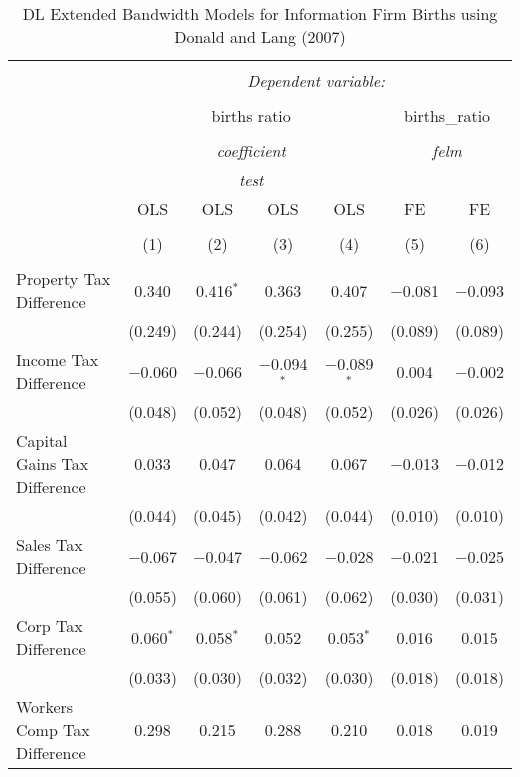 
\begin{table}[!htbp] \centering 
  \caption{DL Extended Bandwidth Models for  Information Firm Births using Donald and Lang (2007)} 
  \label{} 
\begin{tabular}{@{\extracolsep{5pt}}lcccccc} 
\\[-1.8ex]\hline 
\hline \\[-1.8ex] 
 & \multicolumn{6}{c}{\textit{Dependent variable:}} \\ 
\cline{2-7} 
\\[-1.8ex] & \multicolumn{4}{c}{births ratio} & \multicolumn{2}{c}{births\_ratio} \\ 
\\[-1.8ex] & \multicolumn{4}{c}{\textit{coefficient}} & \multicolumn{2}{c}{\textit{felm}} \\ 
 & \multicolumn{4}{c}{\textit{test}} & \multicolumn{2}{c}{\textit{}} \\ 
 & OLS & OLS & OLS & OLS & FE & FE \\ 
\\[-1.8ex] & (1) & (2) & (3) & (4) & (5) & (6)\\ 
\hline \\[-1.8ex] 
 Property Tax Difference & 0.340 & 0.416$^{*}$ & 0.363 & 0.407 & $-$0.081 & $-$0.093 \\ 
  & (0.249) & (0.244) & (0.254) & (0.255) & (0.089) & (0.089) \\ 
  Income Tax Difference & $-$0.060 & $-$0.066 & $-$0.094$^{*}$ & $-$0.089$^{*}$ & 0.004 & $-$0.002 \\ 
  & (0.048) & (0.052) & (0.048) & (0.052) & (0.026) & (0.026) \\ 
  Capital Gains Tax Difference & 0.033 & 0.047 & 0.064 & 0.067 & $-$0.013 & $-$0.012 \\ 
  & (0.044) & (0.045) & (0.042) & (0.044) & (0.010) & (0.010) \\ 
  Sales Tax Difference & $-$0.067 & $-$0.047 & $-$0.062 & $-$0.028 & $-$0.021 & $-$0.025 \\ 
  & (0.055) & (0.060) & (0.061) & (0.062) & (0.030) & (0.031) \\ 
  Corp Tax Difference & 0.060$^{*}$ & 0.058$^{*}$ & 0.052 & 0.053$^{*}$ & 0.016 & 0.015 \\ 
  & (0.033) & (0.030) & (0.032) & (0.030) & (0.018) & (0.018) \\ 
  Workers Comp Tax Difference & 0.298 & 0.215 & 0.288 & 0.210 & 0.018 & 0.019 \\ 

\end{tabular}
\end{table}
